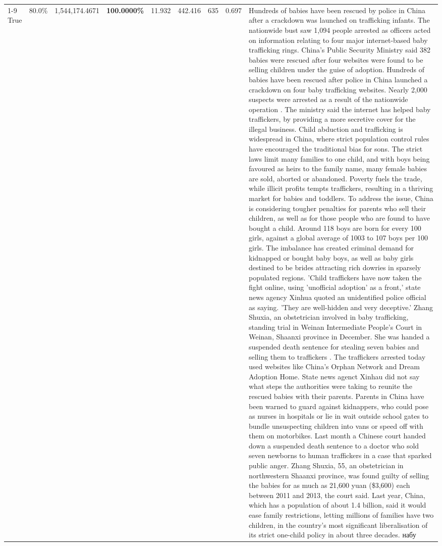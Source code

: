\begin{table}[H]
\begin{tabular}{lllrlllll}
\cline{1-9}
True & 80.0\% & 1,544,174.4671 & \bfseries \color{red} 100.0000\% & 11.932 & 442.416 & 635 & 0.697 & Hundreds of babies have been rescued by police in China after a crackdown was launched on trafficking infants. The nationwide bust saw 1,094 people arrested as officers acted on information relating to four major internet-based baby trafficking rings. China's Public Security Ministry said 382 babies were rescued after four websites were found to be selling children under the guise of adoption. Hundreds of babies have been rescued after police in China launched a crackdown on four baby trafficking websites. Nearly 2,000 suspects were arrested as a result of the nationwide operation . The ministry said the internet has helped baby traffickers, by providing a more secretive cover for the illegal business. Child abduction and trafficking is widespread in China, where strict population control rules have encouraged the traditional bias for sons. The strict laws limit many families to one child, and with boys being favoured as heirs to the family name, many female babies are sold, aborted or abandoned. Poverty fuels the trade, while illicit profits tempts traffickers, resulting in a thriving market for babies and toddlers. To address the issue, China is considering tougher penalties for parents who sell their children, as well as for those people who are found to have bought a child. Around 118 boys are born for every 100 girls, against a global average of 1003 to 107 boys per 100 girls. The imbalance has created criminal demand for kidnapped or bought baby boys, as well as baby girls destined to be brides attracting rich dowries in sparsely populated regions. 'Child traffickers have now taken the fight online, using 'unofficial adoption' as a front,' state news agency Xinhua quoted an unidentified police official as saying. 'They are well-hidden and very deceptive.' Zhang Shuxia, an obstetrician involved in baby trafficking, standing trial in Weinan Intermediate People's Court in Weinan, Shaanxi province in December. She was handed a suspended death sentence for stealing seven babies and selling them to traffickers . The traffickers arrested today used websites like China's Orphan Network and Dream Adoption Home. State news agenct Xinhau did not say what steps the authorities were taking to reunite the rescued babies with their parents. Parents in China have been warned to guard against kidnappers, who could pose as nurses in hospitals or lie in wait outside school gates to bundle unsuspecting children into vans or speed off with them on motorbikes. Last month a Chinese court handed down a suspended death sentence to a doctor who sold seven newborns to human traffickers in a case that sparked public anger. Zhang Shuxia, 55, an obstetrician in northwestern Shaanxi province, was found guilty of selling the babies for as much as 21,600 yuan (\$3,600) each between 2011 and 2013, the court said. Last year, China, which has a population of about 1.4 billion, said it would ease family restrictions, letting millions of families have two children, in the country's most significant liberalisation of its strict one-child policy in about three decades. набу \\

\end{tabular}
\end{table}
